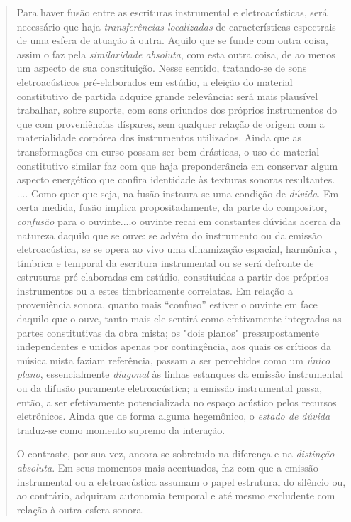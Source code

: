 \documentclass{ppgmus}
\begin{document}
\begin{quotation}

Para haver fusão entre as escrituras instrumental e eletroacústicas,
será necessário que haja \textit{transferências localizadas} de 
características espectrais de uma esfera de atuação à outra.
Aquilo que se funde com outra coisa, assim o faz pela \textit{similaridade
absoluta}, com esta outra coisa, de ao menos um aspecto de sua 
constituição. Nesse sentido, tratando-se de sons eletroacústicos 
pré-elaborados em estúdio, a eleição do material constitutivo de partida
adquire grande relevância: será mais plausível trabalhar, sobre suporte,
com sons oriundos dos próprios instrumentos do que com proveniências
díspares, sem qualquer relação de origem com a materialidade corpórea
dos instrumentos utilizados. Ainda que as transformações em curso possam ser
bem drásticas, o uso de material constitutivo similar faz com que
haja preponderância em conservar algum aspecto energético que confira
identidade às texturas sonoras resultantes.
....
Como quer que seja, na fusão instaura-se uma condição de \textit{dúvida}.
Em certa medida, fusão implica propositadamente, da parte do compositor,
\textit{confusão} para o ouvinte....o ouvinte recai em constantes dúvidas
acerca da natureza daquilo que se ouve: se advém do instrumento ou da 
emissão eletroacústica, se se opera ao vivo uma dinamização espacial, harmônica
, tímbrica e temporal da escritura instrumental ou se será defronte de
estruturas pré-elaboradas em estúdio, constituidas a partir dos próprios
instrumentos ou a estes timbricamente correlatas. Em relação a proveniência
sonora, quanto mais ``confuso'' estiver o ouvinte em face daquilo que
o ouve, tanto mais ele sentirá como efetivamente integradas as partes
constitutivas da obra mista; os "dois planos" pressupostamente independentes
e unidos apenas por contingência, aos quais os críticos da música mista
faziam referência, passam a ser percebidos como um \textit{único plano},
essencialmente \textit{diagonal} às linhas estanques da emissão instrumental
ou da difusão puramente eletroacústica; a emissão instrumental passa,
então, a ser efetivamente potencializada no espaço acústico pelos recursos 
eletrônicos. Ainda que de forma alguma hegemônico, o \textit{estado de
dúvida} traduz-se como momento supremo da interação.

O contraste, por sua vez, ancora-se sobretudo na diferença e na 
\textit{distinção absoluta}. Em seus momentos mais acentuados, faz com
que a emissão instrumental ou a eletroacústica assumam o papel estrutural
do silêncio ou, ao contrário, adquiram autonomia temporal e até mesmo
excludente com relação à outra esfera sonora.
\end{quotation}
\end{document}
